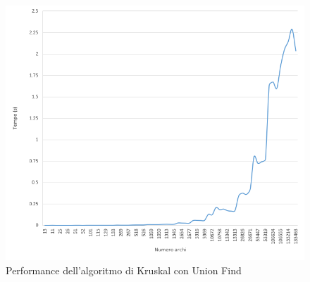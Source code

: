\begin{figure}[H]
 	\hspace{-1cm}\includegraphics[width=18.5cm]{Img/kruskal_uf_result.png}
	\caption{Performance dell'algoritmo di Kruskal con Union Find}
\end{figure}


\pagebreak